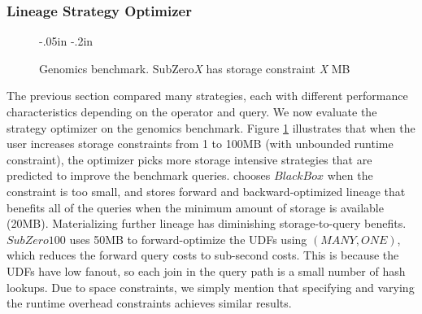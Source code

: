 \subsubsection{Lineage Strategy Optimizer}

\begin{figure}[tb]
\vspace{-.1in}
\advance\leftskip-.05in
\advance\rightskip-.2in
\caption{Genomics benchmark.  SubZero{\it X} has storage constraint {\it X} MB }
\vspace{.1in}
\label{f:goptimizer}
\end{figure}



The previous section compared many strategies, each with different performance
characteristics depending on the operator and query.  We now evaluate the
\sys{} strategy optimizer on the genomics benchmark. Figure \ref{f:goptimizer}
illustrates that when the user increases storage constraints from 1 to 100MB
(with unbounded runtime constraint), the optimizer picks more storage intensive
strategies that are predicted to improve the benchmark queries.  \sys{} chooses
$BlackBox$ when the constraint is too small, and stores forward and
backward-optimized lineage that benefits all of the queries when the minimum
amount of storage is available (20MB).  Materializing further lineage has
diminishing storage-to-query benefits.  $SubZero100$ uses 50MB to
forward-optimize the UDFs using $(MANY, ONE)$, which reduces the forward query
costs to sub-second costs. This is because the UDFs have low fanout, so each
join in the query path is a small number of hash lookups.  Due to space
constraints, we simply mention that specifying and varying the runtime overhead
constraints achieves similar results.




